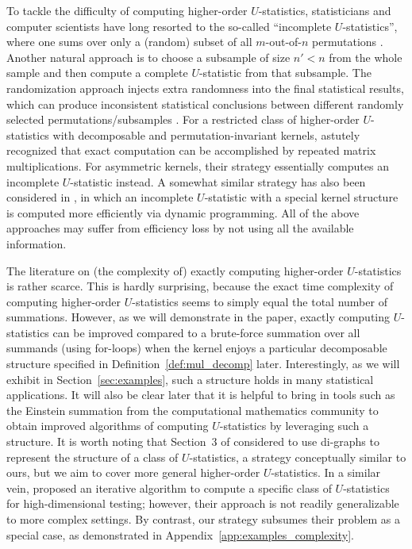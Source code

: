 \documentclass[12pt]{article}
\theoremstyle{plain}
\theoremstyle{definition}
\begin{document}
\begin{bibunit}[agsm]
To tackle the difficulty of computing higher-order $U$-statistics, statisticians and computer scientists have long resorted to the so-called ``incomplete $U$-statistics'', where one sums over only a (random) subset of all $m$-out-of-$n$ permutations \citep{blom1976some, nowicki1988subgraph, shao2025u}. Another natural approach is to choose a subsample of size $n' < n$ from the whole sample and then compute a complete $U$-statistic from that subsample. The randomization approach injects extra randomness into the final statistical results, which can produce inconsistent statistical conclusions between different randomly selected permutations/subsamples \citep{guo2025rank}. For a restricted class of higher-order $U$-statistics with decomposable and permutation-invariant kernels, \citet{kong2018estimating} astutely recognized that exact computation can be accomplished by repeated matrix multiplications. For asymmetric kernels, their strategy essentially computes an incomplete $U$-statistic instead. A somewhat similar strategy has also been considered in \citet{zhang2025adaptive}, in which an incomplete $U$-statistic with a special kernel structure is computed more efficiently via dynamic programming. All of the above approaches may suffer from efficiency loss by not using all the available information.

The literature on (the complexity of) exactly computing higher-order $U$-statistics is rather scarce. This is hardly surprising, because the exact time complexity of computing higher-order $U$-statistics seems to simply equal the total number of summations. However, as we will demonstrate in the paper, exactly computing $U$-statistics can be improved compared to a brute-force summation over all summands (using for-loops) when the kernel enjoys a particular decomposable structure specified in Definition~\ref{def:mul_decomp} later. Interestingly, as we will exhibit in Section~\ref{sec:examples}, such a structure holds in many statistical applications. It will also be clear later that it is helpful to bring in tools such as the Einstein summation from the computational mathematics community to obtain improved algorithms of computing $U$-statistics by leveraging such a structure. It is worth noting that Section~3 of \citet{liu2024hypothesis} considered to use di-graphs to represent the structure of a class of $U$-statistics, a strategy conceptually similar to ours, but we aim to cover more general higher-order $U$-statistics. In a similar vein, \citet{he2021asymptotically} proposed an iterative algorithm to compute a specific class of $U$-statistics for high-dimensional testing; however, their approach is not readily generalizable to more complex settings. By contrast, our strategy subsumes their problem as a special case, as demonstrated in Appendix~\ref{app:examples_complexity}.


\end{bibunit}
\end{document}
